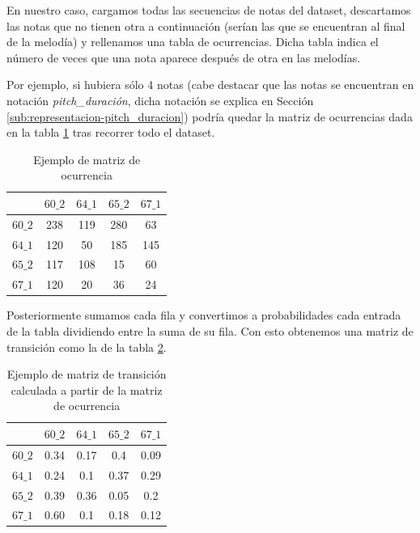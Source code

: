     En nuestro caso, cargamos todas las secuencias de notas del dataset, descartamos las notas que no tienen otra a continuación (serían las que se encuentran al final de la melodía) y rellenamos una tabla de ocurrencias. Dicha tabla indica el número de veces que una nota aparece después de otra en las melodías.

    Por ejemplo, si hubiera sólo 4 notas (cabe destacar que las notas se encuentran en notación \textit{pitch\_duración}, dicha notación se explica en Sección \ref{sub:representacion-pitch_duracion}) podría quedar la matriz de ocurrencias dada en la tabla \ref{tab:sampleOcurrenceMatrix} tras recorrer todo el dataset.

    \begin{table}[h]
	\centering
	\begin{tabular}{c|c|c|c|c}
		\textbf{} & \textbf{$60\_2$} & \textbf{$64\_1$} &         
            \textbf{$65\_2$} &     \textbf{$67\_1$}\\
		\hline
		\textbf{$60\_2$} & 238 & 119 & 280 & 63\\
		\hline
		\textbf{$64\_1$} & 120 & 50 & 185 & 145\\
		\hline
		\textbf{$65\_2$} & 117 & 108 & 15 & 60\\
		\hline
		\textbf{$67\_1$} & 120 & 20 & 36 & 24\\
	\end{tabular}
	\caption{Ejemplo de matriz de ocurrencia}
	\label{tab:sampleOcurrenceMatrix}
    \end{table}

    Posteriormente sumamos cada fila y convertimos a probabilidades cada entrada de la tabla dividiendo entre la suma de su fila. Con esto obtenemos una matriz de transición como la de la tabla \ref{tab:sampleTransitionMatrix}.

    \begin{table}[h]
	\centering
	\begin{tabular}{c|c|c|c|c}
		\textbf{} & \textbf{$60\_2$} & \textbf{$64\_1$} &         
            \textbf{$65\_2$} &     \textbf{$67\_1$}\\
		\hline
		\textbf{$60\_2$} & 0.34 & 0.17 & 0.4 & 0.09\\
		\hline
		\textbf{$64\_1$} & 0.24 & 0.1 & 0.37 & 0.29\\
		\hline
		\textbf{$65\_2$} & 0.39 & 0.36 & 0.05 & 0.2\\
		\hline
		\textbf{$67\_1$} & 0.60 & 0.1 & 0.18 & 0.12\\
	\end{tabular}
	\caption{Ejemplo de matriz de transición calculada a partir de la matriz de ocurrencia}
	\label{tab:sampleTransitionMatrix}
    \end{table}

